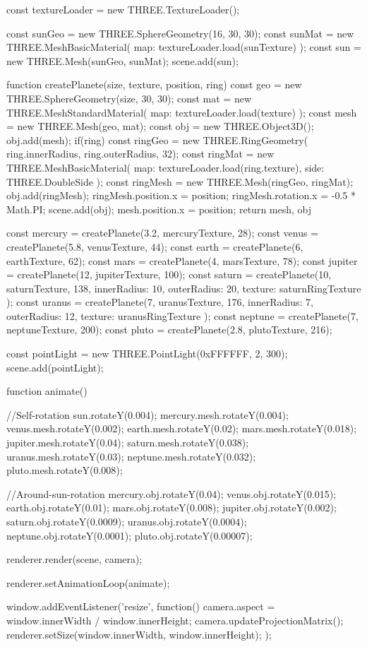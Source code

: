 const textureLoader = new THREE.TextureLoader();

const sunGeo = new THREE.SphereGeometry(16, 30, 30);
const sunMat = new THREE.MeshBasicMaterial({
    map: textureLoader.load(sunTexture)
});
const sun = new THREE.Mesh(sunGeo, sunMat);
scene.add(sun);

function createPlanete(size, texture, position, ring) {
    const geo = new THREE.SphereGeometry(size, 30, 30);
    const mat = new THREE.MeshStandardMaterial({
        map: textureLoader.load(texture)
    });
    const mesh = new THREE.Mesh(geo, mat);
    const obj = new THREE.Object3D();
    obj.add(mesh);
    if(ring) {
        const ringGeo = new THREE.RingGeometry(
            ring.innerRadius,
            ring.outerRadius,
            32);
        const ringMat = new THREE.MeshBasicMaterial({
            map: textureLoader.load(ring.texture),
            side: THREE.DoubleSide
        });
        const ringMesh = new THREE.Mesh(ringGeo, ringMat);
        obj.add(ringMesh);
        ringMesh.position.x = position;
        ringMesh.rotation.x = -0.5 * Math.PI;
    }
    scene.add(obj);
    mesh.position.x = position;
    return {mesh, obj}
}

const mercury = createPlanete(3.2, mercuryTexture, 28);
const venus = createPlanete(5.8, venusTexture, 44);
const earth = createPlanete(6, earthTexture, 62);
const mars = createPlanete(4, marsTexture, 78);
const jupiter = createPlanete(12, jupiterTexture, 100);
const saturn = createPlanete(10, saturnTexture, 138, {
    innerRadius: 10,
    outerRadius: 20,
    texture: saturnRingTexture
});
const uranus = createPlanete(7, uranusTexture, 176, {
    innerRadius: 7,
    outerRadius: 12,
    texture: uranusRingTexture
});
const neptune = createPlanete(7, neptuneTexture, 200);
const pluto = createPlanete(2.8, plutoTexture, 216);

const pointLight = new THREE.PointLight(0xFFFFFF, 2, 300);
scene.add(pointLight);

function animate() {
    //Self-rotation
    sun.rotateY(0.004);
    mercury.mesh.rotateY(0.004);
    venus.mesh.rotateY(0.002);
    earth.mesh.rotateY(0.02);
    mars.mesh.rotateY(0.018);
    jupiter.mesh.rotateY(0.04);
    saturn.mesh.rotateY(0.038);
    uranus.mesh.rotateY(0.03);
    neptune.mesh.rotateY(0.032);
    pluto.mesh.rotateY(0.008);

    //Around-sun-rotation
    mercury.obj.rotateY(0.04);
    venus.obj.rotateY(0.015);
    earth.obj.rotateY(0.01);
    mars.obj.rotateY(0.008);
    jupiter.obj.rotateY(0.002);
    saturn.obj.rotateY(0.0009);
    uranus.obj.rotateY(0.0004);
    neptune.obj.rotateY(0.0001);
    pluto.obj.rotateY(0.00007);

    renderer.render(scene, camera);
}

renderer.setAnimationLoop(animate);

window.addEventListener('resize', function() {
    camera.aspect = window.innerWidth / window.innerHeight;
    camera.updateProjectionMatrix();
    renderer.setSize(window.innerWidth, window.innerHeight);
});